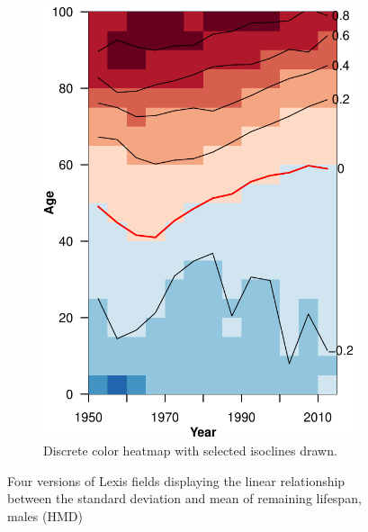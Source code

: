 \documentclass{article}
\begin{document}
\begin{figure}
\begin{subfigure}{.5\textwidth}
  \includegraphics[scale=.6]{Figures/Fig12-crop.pdf}
  \caption{Discrete color heatmap with selected isoclines drawn.}
  \label{fig:sfig4}
\end{subfigure}
\caption{Four versions of Lexis fields displaying the linear
relationship between the standard deviation and mean of remaining
lifespan, males (HMD)}
\label{fig:fig}
\end{figure}



\nocite{vaupel1987thousands}

\FloatBarrier
\singlespacing

   
\end{document}
